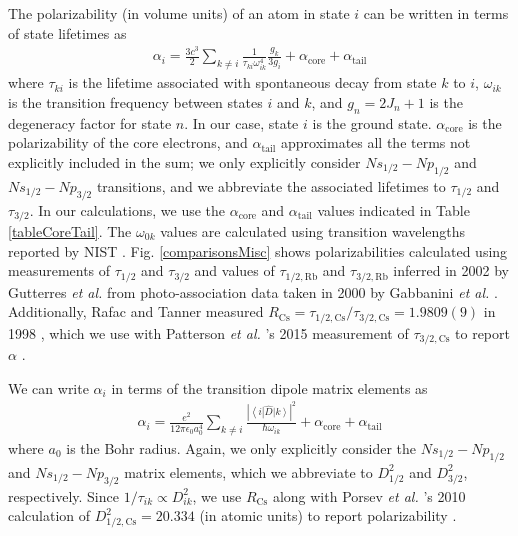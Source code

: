 \documentclass[twocolumn,prl,showpacs,superscriptaddress]{revtex4-1}   %
\newcommand{\brakett}[3]{\left\langle #1 \right|#2\left| #3 \right\rangle}
\newcommand{\figref}[1]{Fig. \ref{#1}}
\newcommand{\acore}{\alpha_{\textrm{core}}}
\newcommand{\atail}{\alpha_{\textrm{tail}}}
\newcommand{\rcs}{R_{\mathrm{Cs}}}
\newcommand{\etal}{\textit{et al. }}
\begin{document}
The polarizability (in volume units) of an atom in state $i$ can be written in terms of state lifetimes as
\begin{align}
	\alpha_i = \frac{3c^3}{2} \sum_{k\neq i} 
	\frac{1}{\tau_{ki} \omega_{ik}^4} \frac{g_k}{3g_i}
	+ \acore
	+ \atail
	\label{polFromLifetimes}
\end{align}
where $\tau_{ki}$ is the lifetime associated with spontaneous decay from state $k$ to $i$, $\omega_{ik}$ is the transition frequency between states $i$ and $k$, and $g_n = 2J_n+1$ is the degeneracy factor for state $n$. In our case, state $i$ is the ground state. $\acore$ is the polarizability of the core electrons, and $\atail$ approximates all the terms not explicitly included in the sum; we only explicitly consider $Ns_{1/2}-Np_{1/2}$ and $Ns_{1/2}-Np_{3/2}$ transitions, and we abbreviate the associated lifetimes to $\tau_{1/2}$ and $\tau_{3/2}$.
In our calculations, we use the $\acore$ and $\atail$ values indicated in Table \ref{tableCoreTail}.
The $\omega_{0k}$ values are calculated using transition wavelengths reported by NIST \cite{NIST}. 
\figref{comparisonsMisc} shows polarizabilities calculated using measurements of $\tau_{1/2}$ and $\tau_{3/2}$
\cite{Young1994,Rafac1999,Bouloufa2007,Volz2006,Simsarian1998,Wang1997}
and values of $\tau_{1/2,\mathrm{Rb}}$ and $\tau_{3/2,\mathrm{Rb}}$ inferred in 2002 by Gutterres \etal from photo-association data taken in 2000 by Gabbanini \etal \cite{Gabbanini2000,Gutterres2002}.
 Additionally, Rafac and Tanner measured $\rcs = \tau_{1/2,\mathrm{Cs}}/\tau_{3/2,\mathrm{Cs}} = 1.9809(9)$ in 1998 \cite{Rafac1998}, which we use with Patterson \etal's 2015 measurement of $\tau_{3/2,\mathrm{Cs}}$ to report $\alpha$ \cite{Patterson2015}.

We can write $\alpha_i$ in terms of the transition dipole matrix elements as
\begin{align}
	\alpha_i = \frac{e^2}{12 \pi \epsilon_0 a_0^4} \sum_{k\neq i}	
	\frac{\left|\brakett{i}{\hat{D}}{k}\right|^2}{\hbar\omega_{ik}}	
	+ \acore
	+ \atail
	\label{polFromMatrixElements}
\end{align}
where $a_0$ is the Bohr radius. 
Again, we only explicitly consider the $Ns_{1/2}-Np_{1/2}$ and $Ns_{1/2}-Np_{3/2}$ matrix elements, 
which we abbreviate to $D_{1/2}^2$ and $D_{3/2}^2$, respectively. 
Since $1/\tau_{ik} \propto D_{ik}^2$,
we use $\rcs$ along with Porsev \etal's 2010 calculation of $D_{1/2,\mathrm{Cs}}^2 = 20.334$ (in atomic units) to report polarizability \cite{Rafac1998,Porsev2010}.
\end{document}
